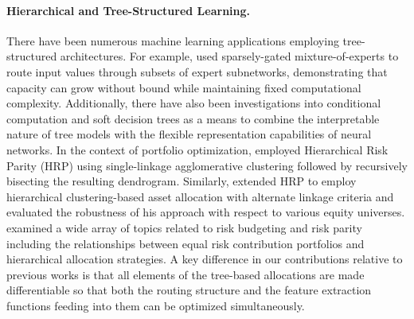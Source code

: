 \paragraph{Hierarchical and Tree-Structured Learning.} There have been numerous machine learning applications employing tree-structured architectures. For example, \citet{Shazeer2017} used sparsely-gated mixture-of-experts to route input values through subsets of expert subnetworks, demonstrating that capacity can grow without bound while maintaining fixed computational complexity. Additionally, there have also been investigations into conditional computation and soft decision trees as a means to combine the interpretable nature of tree models with the flexible representation capabilities of neural networks. In the context of portfolio optimization, \citet{LopezdePrado2016} employed Hierarchical Risk Parity (HRP) using single-linkage agglomerative clustering followed by recursively bisecting the resulting dendrogram. Similarly, \citet{Raffinot2018} extended HRP to employ hierarchical clustering-based asset allocation with alternate linkage criteria and evaluated the robustness of his approach with respect to various equity universes. \citet{Roncalli2013} examined a wide array of topics related to risk budgeting and risk parity including the relationships between equal risk contribution portfolios and hierarchical allocation strategies. A key difference in our contributions relative to previous works is that all elements of the tree-based allocations are made differentiable so that both the routing structure and the feature extraction functions feeding into them can be optimized simultaneously.

